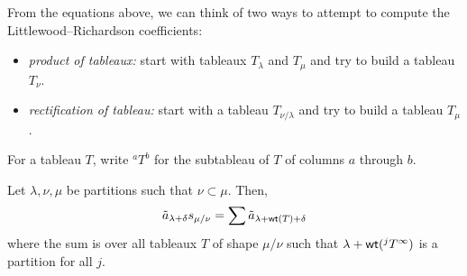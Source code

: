 From the equations above, we can think of two ways to attempt to compute the Littlewood--Richardson coefficients:
\begin{itemize}
    \item \emph{product of tableaux:} start with tableaux \(T_\lambda\) and \(T_\mu\) and try to build a tableau \(T_\nu\). 
    \item \emph{rectification of tableau:} start with a tableau \(T_{\nu / \lambda}\) and try to build a tableau \(T_\mu\).
\end{itemize}

For a tableau \(T\),
write \(^aT^b\) for the subtableau of \(T\) of columns \(a\) through \(b\).

\begin{theorem} \label{thm:skew-tilde-a}
    Let \(\lambda, \nu, \mu\) be partitions such that \(\nu \subset \mu\).
    Then,
    \begin{equation}
        \tilde{a}_{\lambda + \delta} s_{\mu/\nu}
        =
        \sum \tilde{a}_{\lambda + \operatorname{\mathsf{wt}}(T) + \delta}
    \end{equation}
    where the sum is over all tableaux \(T\) of shape \(\mu/\nu\)
    such that \(\lambda + \operatorname{\mathsf{wt}}(^jT^\infty)\) is a partition for all \(j\).
\end{theorem}

